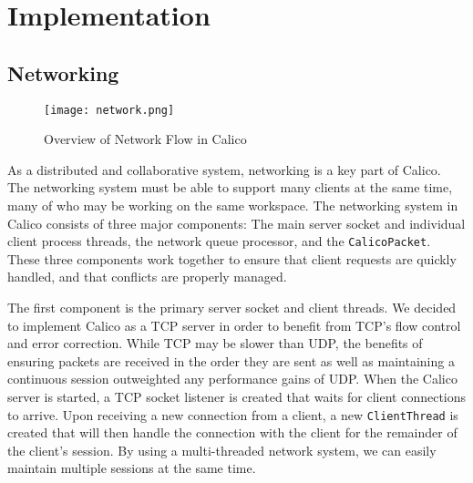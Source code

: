 \chapter{Implementation}









\section{Networking}

\begin{figure}[htb]
  \centering
  \texttt{[image: network.png]}
  \caption{Overview of Network Flow in Calico}
  \label{fig:network}
\end{figure}
As a distributed and collaborative system, networking is a key part of Calico. The networking system must be able to support many clients at the same time, many of who may be working on the same workspace. The networking system in Calico consists of three major components: The main server socket and individual client process threads, the network queue processor, and the \texttt{CalicoPacket}. These three components work together to ensure that client requests are quickly handled, and that conflicts are properly managed.

The first component is the primary server socket and client threads. We decided to implement Calico as a TCP\cite{network} server in order to benefit from TCP's flow control and error correction. While TCP may be slower than UDP, the benefits of ensuring packets are received in the order they are sent as well as maintaining a continuous session outweighted any performance gains of UDP. When the Calico server is started, a TCP socket listener is created that waits for client connections to arrive. Upon receiving a new connection from a client, a new \texttt{ClientThread} is created that will then handle the connection with the client for the remainder of the client's session. By using a multi-threaded network system, we can easily maintain multiple sessions at the same time.

